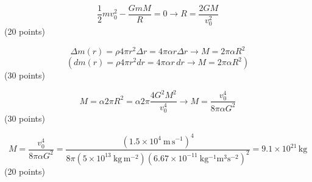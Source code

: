 \[
  \frac{1}{2}mv_0^2 - \frac{GmM}{R} = 0
  \rightarrow R = \frac{2GM}{v_0^2}
\]
\hfill(20 points)

\[
  \Delta m(r) = \rho4\pi r^2\Delta r = 4\pi\alpha r\Delta r
  \rightarrow M = 2\pi\alpha R^2
\]
\[
  \left(dm(r) = \rho4\pi r^2dr = 4\pi\alpha r\,dr
  \rightarrow M = 2\pi\alpha R^2\right)
\]
\hfill(30 points)

\[
  M = \alpha2\pi R^2 = \alpha2\pi\frac{4G^2M^2}{v_0^4}
  \rightarrow M = \frac{v_0^4}{8\pi\alpha G^2}
\]
\hfill(30 points)

\[
  M = \frac{v_0^4}{8\pi\alpha G^2}
    = \frac{(1.5\times10^4\ \mathrm{m\,s^{-1}})^4}
      {8\pi(5\times10^{13}\ \mathrm{kg\,m^{-2}})
       (6.67\times10^{-11}\ \mathrm{kg^{-1}m^3s^{-2}})^2}
    = 9.1\times10^{21}\,\mathrm{kg}
\]
\hfill(20 points)
